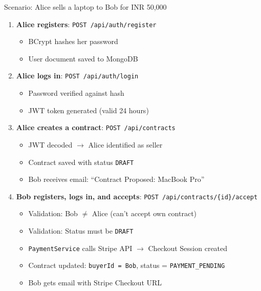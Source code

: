 \documentclass[11pt, a4paper]{article}
\begin{document}
\begin{examplebox}{Scenario: Alice sells a laptop to Bob for INR 50,000}
\begin{enumerate}[leftmargin=*]
    \item \textbf{Alice registers}: \texttt{POST /api/auth/register}
        \begin{itemize}
            \item BCrypt hashes her password
            \item User document saved to MongoDB
        \end{itemize}
    
    \item \textbf{Alice logs in}: \texttt{POST /api/auth/login}
        \begin{itemize}
            \item Password verified against hash
            \item JWT token generated (valid 24 hours)
        \end{itemize}
    
    \item \textbf{Alice creates a contract}: \texttt{POST /api/contracts}
        \begin{itemize}
            \item JWT decoded $\rightarrow$ Alice identified as seller
            \item Contract saved with status \texttt{DRAFT}
            \item Bob receives email: ``Contract Proposed: MacBook Pro''
        \end{itemize}
    
    \item \textbf{Bob registers, logs in, and accepts}: \texttt{POST /api/contracts/\{id\}/accept}
        \begin{itemize}
            \item Validation: Bob $\neq$ Alice (can't accept own contract)
            \item Validation: Status must be \texttt{DRAFT}
            \item \texttt{PaymentService} calls Stripe API $\rightarrow$ Checkout Session created
            \item Contract updated: \texttt{buyerId = Bob}, status = \texttt{PAYMENT\_PENDING}
            \item Bob gets email with Stripe Checkout URL
        \end{itemize}
    

\end{enumerate}
\end{examplebox}
\end{document}
